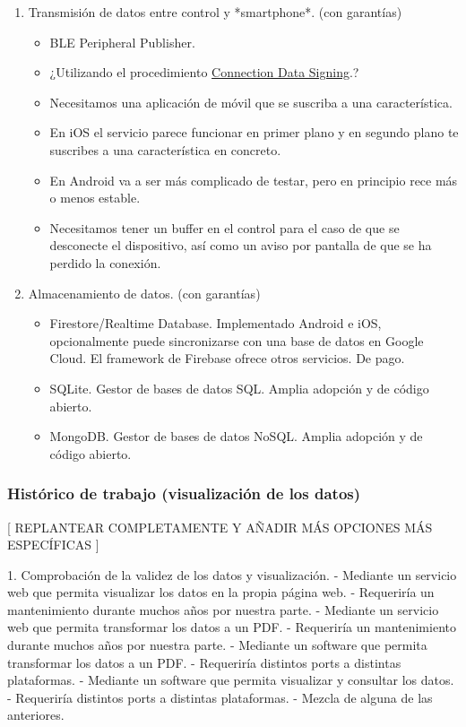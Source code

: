 \begin{enumerate}
    \item Transmisión de datos entre control y *smartphone*. (con garantías)
    \begin{itemize}
        \item BLE Peripheral Publisher.
        \item ¿Utilizando el procedimiento \href{https://lpccs-docs.renesas.com/Tutorial-DA145x-BLE-Security/access_and_signing.html}{Connection Data Signing}.?
        \item Necesitamos una aplicación de móvil que se suscriba a una característica.
        \item En iOS el servicio parece funcionar en primer plano y en segundo plano
              te suscribes a una característica en concreto.
        \item En Android va a ser más complicado de testar, pero en principio
              rece más o menos estable.
        \item Necesitamos tener un buffer en el control para el caso de que se
    desconecte el dispositivo, así como un aviso por pantalla de que se
    ha perdido la conexión.
    \end{itemize}
    \item Almacenamiento de datos. (con garantías)
    \begin{itemize}
        \item Firestore/Realtime Database. Implementado Android e iOS,
        opcionalmente puede sincronizarse con una base de datos en
        Google Cloud. El framework de Firebase ofrece otros servicios.
        De pago.
        \item SQLite. Gestor de bases de datos SQL. Amplia adopción y de código
        abierto.
        \item MongoDB. Gestor de bases de datos NoSQL. Amplia adopción y de código
        abierto.
    \end{itemize}
\end{enumerate}

\subsubsection{Histórico de trabajo (visualización de los datos)}

[ REPLANTEAR COMPLETAMENTE Y AÑADIR MÁS OPCIONES MÁS ESPECÍFICAS ]

1. Comprobación de la validez de los datos y visualización.
    - Mediante un servicio web que permita visualizar los datos en la
    propia página web.
        - Requeriría un mantenimiento durante muchos años por nuestra parte.
    - Mediante un servicio web que permita transformar los datos a un PDF.
        - Requeriría un mantenimiento durante muchos años por nuestra parte.
    - Mediante un software que permita transformar los datos a un PDF.
        - Requeriría distintos ports a distintas plataformas.
    - Mediante un software que permita visualizar y consultar los datos.
        - Requeriría distintos ports a distintas plataformas.
    - Mezcla de alguna de las anteriores.
